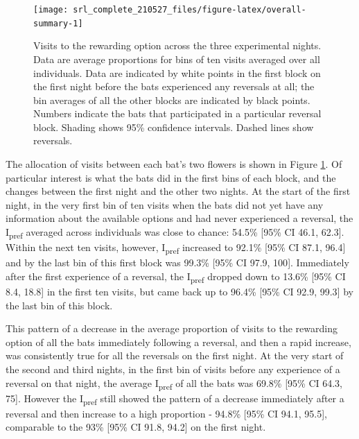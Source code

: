 \documentclass[
]{article}
\begin{document}
\begin{figure}[H]

{\centering \texttt{[image: srl\_complete\_210527\_files/figure-latex/overall-summary-1]} 

}

\caption{Visits to the rewarding option across the three experimental nights. Data are average proportions for bins of ten visits averaged over all individuals. Data are indicated by white points in the first block on the first night before the bats experienced any reversals at all; the bin averages of all the other blocks are indicated by black points. Numbers indicate the bats that participated in a particular reversal block. Shading shows 95\% confidence intervals. Dashed lines show reversals.}\label{fig:overall-summary}
\end{figure}

The allocation of visits between each bat's two flowers is shown in Figure \ref{fig:overall-summary}. Of particular interest is what the bats did in the first bins of each block, and the changes between the first night and the other two nights. At the start of the first night, in the very first bin of ten visits when the bats did not yet have any information about the available options and had never experienced a reversal, the I\textsubscript{pref} averaged across individuals was close to chance: 54.5\% {[}95\% CI 46.1, 62.3{]}. Within the next ten visits, however, I\textsubscript{pref} increased to 92.1\% {[}95\% CI 87.1, 96.4{]} and by the last bin of this first block was 99.3\% {[}95\% CI 97.9, 100{]}. Immediately after the first experience of a reversal, the I\textsubscript{pref} dropped down to 13.6\% {[}95\% CI 8.4, 18.8{]} in the first ten visits, but came back up to 96.4\% {[}95\% CI 92.9, 99.3{]} by the last bin of this block.

This pattern of a decrease in the average proportion of visits to the rewarding option of all the bats immediately following a reversal, and then a rapid increase, was consistently true for all the reversals on the first night. At the very start of the second and third nights, in the first bin of visits before any experience of a reversal on that night, the average I\textsubscript{pref} of all the bats was 69.8\% {[}95\% CI 64.3, 75{]}. However the I\textsubscript{pref} still showed the pattern of a decrease immediately after a reversal and then increase to a high proportion - 94.8\% {[}95\% CI 94.1, 95.5{]}, comparable to the 93\% {[}95\% CI 91.8, 94.2{]} on the first night.
\end{document}
